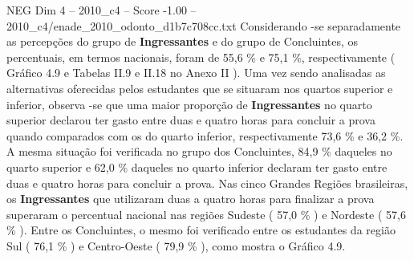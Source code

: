 \begin{textsample}{NEG Dim 4 – 2010\_c4 – Score -1.00 – 2010\_c4/enade\_2010\_odonto\_d1b7c708cc.txt}
Considerando -se separadamente as percepções do grupo de \textbf{Ingressantes} e do grupo de Concluintes, os percentuais, em termos nacionais, foram de 55,6 \% e 75,1 \%, respectivamente ( Gráfico 4.9 e Tabelas II.9 e II.18 no Anexo II ).
Uma vez sendo analisadas as alternativas oferecidas pelos estudantes que se situaram nos quartos superior e inferior, observa -se que uma maior proporção de \textbf{Ingressantes} no quarto superior declarou ter gasto entre duas e quatro horas para concluir a prova quando comparados com os do quarto inferior, respectivamente 73,6 \% e 36,2 \%.
A mesma situação foi verificada no grupo dos Concluintes, 84,9 \% daqueles no quarto superior e 62,0 \% daqueles no quarto inferior declaram ter gasto entre duas e quatro horas para concluir a prova.
Nas cinco Grandes Regiões brasileiras, os \textbf{Ingressantes} que utilizaram duas a quatro horas para finalizar a prova superaram o percentual nacional nas regiões Sudeste ( 57,0 \% ) e Nordeste ( 57,6 \% ).
Entre os Concluintes, o mesmo foi verificado entre os estudantes da região Sul ( 76,1 \% ) e Centro-Oeste ( 79,9 \% ), como mostra o Gráfico 4.9.

\end{textsample}
